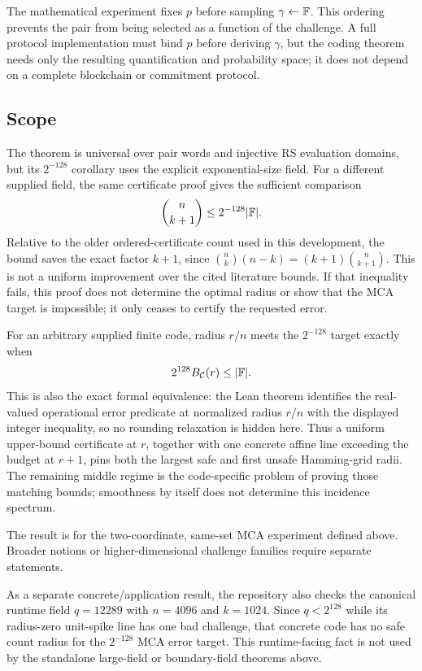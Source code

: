 The mathematical experiment fixes \(p\) before sampling
\(\gamma\leftarrow\mathbb{F}\).  This ordering prevents the pair from being selected as
a function of the challenge.  A full protocol implementation must bind \(p\)
before deriving \(\gamma\), but the coding theorem needs only the resulting
quantification and probability space; it does not depend on a complete
blockchain or commitment protocol.

\subsection{Scope}

The theorem is universal over pair words and injective RS evaluation domains,
but its \(2^{-128}\) corollary uses the explicit exponential-size field.
For a different supplied field, the same certificate proof gives the
sufficient comparison
\[
  \binom n{k+1}\le 2^{-128}|\mathbb{F}|.
\]
Relative to the older ordered-certificate count used in this development,
the bound saves the exact factor \(k+1\), since
\(\binom nk(n-k)=(k+1)\binom n{k+1}\).
This is not a uniform improvement over the cited literature bounds.
If that inequality fails, this proof does not determine the optimal radius or
show that the MCA target is impossible; it only ceases to certify the requested
error.

For an arbitrary supplied finite code, radius \(r/n\) meets the
\(2^{-128}\) target exactly when
\[
  2^{128}B_{\mathcal C}(r)\le|\mathbb{F}|.
\]
This is also the exact formal equivalence: the Lean theorem identifies the
real-valued operational error predicate at normalized radius \(r/n\) with the
displayed integer inequality, so no rounding relaxation is hidden here.
Thus a uniform upper-bound certificate at \(r\), together with one concrete
affine line exceeding the budget at \(r+1\), pins both the largest safe and
first unsafe Hamming-grid radii. The remaining middle regime is the
code-specific problem of proving those matching bounds; smoothness by itself
does not determine this incidence spectrum.

The result is for the two-coordinate, same-set MCA experiment defined above.
Broader notions or higher-dimensional challenge families require
separate statements.

As a separate concrete/application result, the repository also checks the
canonical runtime field \(q=12289\) with \(n=4096\) and \(k=1024\).  Since
\(q<2^{128}\) while its radius-zero unit-spike line has one bad challenge,
that concrete code has no safe count radius for the \(2^{-128}\) MCA error
target. This
runtime-facing fact is not used by the standalone large-field or boundary-field
theorems above.

